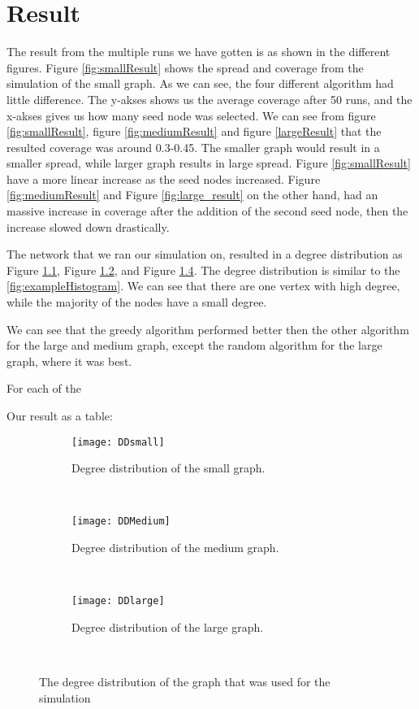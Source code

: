 \chapter{Result}
The result from the multiple runs we have gotten is as shown in the different figures. Figure \ref{fig:smallResult} shows the spread and coverage from the simulation of the small graph. As we can see, the four different algorithm had little difference. The y-akses shows us the average coverage after 50 runs, and the x-akses gives us how many seed node was selected. We can see from figure \ref{fig:smallResult}, figure \ref{fig:mediumResult} and figure \ref{largeResult} that the resulted coverage was around 0.3-0.45. The smaller graph would result in a smaller spread, while larger graph results in large spread. Figure \ref{fig:smallResult} have a more linear increase as the seed nodes increased. Figure \ref{fig:mediumResult} and Figure \ref{fig:large_result} on the other hand, had an massive increase in coverage after the addition of the second seed node, then the increase slowed down drastically. 

The network that we ran our simulation on, resulted in a degree distribution as Figure \ref{fig:smallDegree}, Figure \ref{fig:mediumDegree}, and Figure \ref{fig:largeDegree}. The degree distribution is similar to the \ref{fig:exampleHistogram}. We can see that there are one vertex with high degree, while the majority of the nodes have a small degree. 


We can see that the greedy algorithm performed better then the other algorithm for the large and medium graph, except the random algorithm for the large graph, where it was best.

For each of the  


Our result as a table:

\begin{figure}[h]
\begin{subfigure}{0.3\textwidth}
	\texttt{[image: DDsmall]}
	\caption{Degree distribution of the small graph.}
	\label{fig:smallDegree}
\end{subfigure}
~
\begin{subfigure}{0.3\textwidth}
	\texttt{[image: DDMedium]}
	\caption{Degree distribution of the medium graph.}
	\label{fig:mediumDegree}
\end{subfigure}
~
\begin{subfigure}{0.3\textwidth}
	\texttt{[image: DDlarge]}
	\caption{Degree distribution of the large graph.}
	\label{fig:largeDegree}
\end{subfigure}
~
\caption{The degree distribution of the graph that was used for the simulation}
\end{figure}

